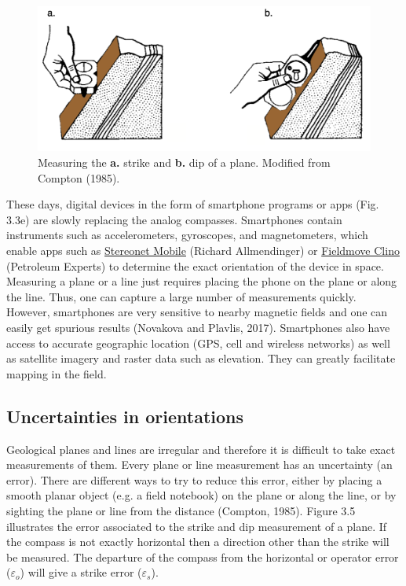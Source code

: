 \documentclass[a4paper , 12pt]{book}
\begin{document}
\begin{figure}[ht]
    \centering
    \includegraphics[width=12cm]{Figures/ch3f4.png}
    \caption{Measuring the \textbf{a.} strike and \textbf{b.} dip of a plane. Modified from Compton (1985).}
\end{figure}

These days, digital devices in the form of smartphone programs or apps (Fig. 3.3e) are slowly replacing the analog compasses. Smartphones contain instruments such as accelerometers, gyroscopes, and magnetometers, which enable apps such as \href{http://www.geo.cornell.edu/geology/faculty/RWA/programs/stereonet-mobile.html}{Stereonet Mobile} (Richard Allmendinger) or \href{https://www.petex.com/products/move-suite/digital-field-mapping/}{Fieldmove Clino} (Petroleum Experts) to determine the exact orientation of the device in space. Measuring a plane or a line just requires placing the phone on the plane or along the line. Thus, one can capture a large number of measurements quickly. However, smartphones are very sensitive to nearby magnetic fields and one can easily get spurious results (Novakova and Plavlis, 2017). Smartphones also have access to accurate geographic location (GPS, cell and wireless networks) as well as satellite imagery and raster data such as elevation. They can greatly facilitate mapping in the field.

\subsection{Uncertainties in orientations} \label{uncertainties}

Geological planes and lines are irregular and therefore it is difficult to take exact measurements of them. Every plane or line measurement has an uncertainty (an error). There are different ways to try to reduce this error, either by placing a smooth planar object (e.g. a field notebook) on the plane or along the line, or by sighting the plane or line from the distance (Compton, 1985). Figure 3.5 illustrates the error associated to the strike and dip measurement of a plane. If the compass is not exactly horizontal then a direction other than the strike will be measured. The departure of the compass from the horizontal or operator error ($\varepsilon_o$) will give a strike error ($\varepsilon_s$).
\end{document}
